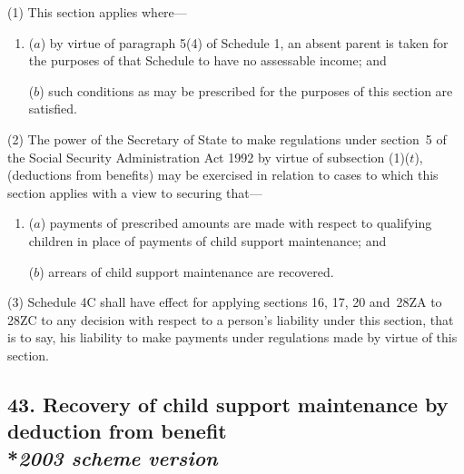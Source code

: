 \documentclass[12pt,a4paper]{article}
\begin{document}
(1) This section applies where—
\begin{enumerate}\item[]
($a$) by virtue of paragraph 5(4)  of Schedule 1, an absent parent is taken for the purposes of that Schedule to have no assessable income; and

($b$) such conditions as may be prescribed for the purposes of this section are satisfied.
\end{enumerate}

(2) The power of the Secretary of State to make regulations under 
section~5 of the Social Security Administration Act 1992 by virtue of subsection (1)($t$),  %
(deductions from benefits) may be exercised in relation to cases to which this section applies with a view to securing that—
\begin{enumerate}\item[]
($a$) payments of prescribed amounts are made with respect to qualifying children in place of payments of child support maintenance; and

($b$) arrears of child support maintenance are recovered.
\end{enumerate}

(3) Schedule 4C shall have effect for applying sections 16, 17, 20 and~28ZA to 28ZC to any decision with respect to a person’s liability under this section, that is to say, his liability to make payments under regulations made by virtue of this section.


\subsection[43. Recovery of child support maintenance by deduction from benefit --- \emph{2003 scheme version}]{43. Recovery of child support maintenance by deduction from benefit\\*\emph{2003 scheme version}}
\end{document}
